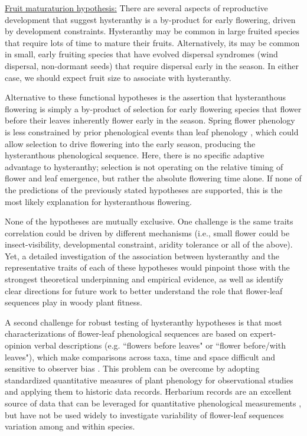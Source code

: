 \documentclass{article}[11pt]
\begin{document}
\underline{Fruit maturaturion hypothesis:} There are several aspects of reproductive development that suggest hysteranthy is a by-product for early flowering, driven by development constraints. Hysteranthy may be common in large fruited species that require lots of time to mature their fruits. Alternatively, its may be common in small, early fruiting species that have evolved dispersal syndromes (wind dispersal, non-dormant seeds) that require dispersal early in the season. In either case, we  should expect fruit size to associate with hysteranthy.

Alternative to these functional hypotheses is the assertion that hysteranthous flowering is simply a by-product of selection for early flowering  species that flower before their leaves inherently flower early in the season. Spring flower phenology is less constrained by prior phenological events than leaf phenology \citep{Savage2019}, which could allow selection to drive flowering into the early season, producing the hysteranthous phenological sequence. Here, there is no specific adaptive advantage to hysteranthy;  selection is not operating on the relative timing of flower and leaf emergence, but rather the absolute flowering time alone. If none of the predictions of the previously stated hypotheses are supported, this is the most likely explanation for hysteranthous flowering.



None of the hypotheses are mutually exclusive. One challenge is the same traits correlation could be driven by different mechanisms (i.e., small flower could be insect-visibility, developmental constraint, aridity tolerance or all of the above). Yet, a detailed investigation of the association between hysteranthy and the representative traits of each of these hypotheses would pinpoint those with the strongest theoretical underpinning and empirical evidence, as well as identify clear directions for future work to better understand the role that flower-leaf sequences play in woody plant fitness.


\noindent A second challenge for robust testing of hysteranthy hypotheses is that most characterizations of flower-leaf phenological sequences are based on expert-opinion verbal descriptions (e.g. ``flowers before leaves" or ``flower before/with leaves"), which make comparisons across taxa, time and space difficult and sensitive to observer bias  \citep[see;][]{Buonaiuto2020}. This problem can be overcome by adopting standardized quantitative measures of plant phenology for observational studies and applying them to historic data records. Herbarium records are an excellent source of data that can be leveraged for quantitative phenological measurements \citep{Willis2017}, but have not be used widely to investigate variability of flower-leaf sequences variation among and within species.
\end{document}
